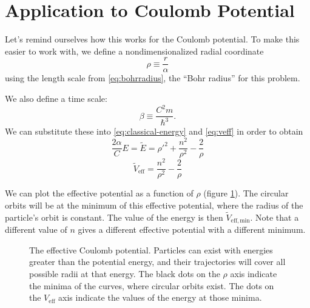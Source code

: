 \documentclass[12pt,twoside]{reedthesis}
\newcommand{\eqn}[1]{\begin{equation}#1\end{equation}}
\begin{document}
\section{Application to Coulomb Potential}
Let's remind ourselves how this works for the Coulomb potential. To make this easier to work with, we define a nondimensionalized radial coordinate
\begin{equation}
\rho \equiv \frac{r}{\alpha}
\label{eq:rho}
\end{equation}
using the length scale from \eqref{eq:bohrradius}, the ``Bohr radius'' for this problem.

We also define a time scale:
\begin{equation}
\beta \equiv \frac{C^2m}{\hbar^3}\mbox{.}
\label{eq:beta}
\end{equation}
We can substitute these into \eqref{eq:classical-energy} and \eqref{eq:veff} in order to obtain 
\eqn{
\frac{2 \alpha}{C}E = \tilde{E}= \rho '^2 + \frac{n^2}{\rho^2}-\frac{2}{\rho}
\label{eq:energy-nondim}
}
\eqn{
\tilde{V}_{\mathrm{eff}} = \frac{n^2}{\rho^2}-\frac{2}{\rho}
\label{eq:veff-nondim}
}

We can plot the effective potential as a function of $\rho$ (figure \ref{fig:hveff}). The circular orbits will be at the minimum of this effective potential, where the radius of the particle's orbit is constant. The value of the energy is then $\tilde{V}_{\mathrm{eff,min}}$. Note that a different value of $n$ gives a different effective potential with a different minimum. 

\begin{figure}[h]
\caption[The effective Coulomb potential]{The effective Coulomb potential. Particles can exist with energies greater than the potential energy, and their trajectories will cover all possible radii at that energy. The black dots on the $\rho$ axis indicate the minima of the curves, where circular orbits exist. The dots on the $V_{\mathrm{eff}}$ axis indicate the values of the energy at those minima.}
\label{fig:hveff}
\end{figure}
\end{document}
